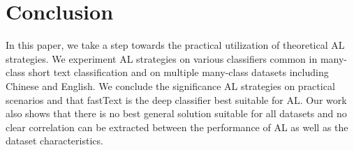 \section{Conclusion}
\label{sec:conclude}
In this paper, we take a step towards the practical utilization of theoretical 
AL strategies. We experiment AL strategies on various classifiers common in many-class short text classification 
and on multiple many-class datasets including Chinese and English. We conclude the significance AL strategies on practical scenarios and that fastText is the deep classifier best suitable for AL.
Our work also shows that there is no best general solution suitable for all datasets and no clear correlation can be extracted between the performance of AL as well as the dataset characteristics.
